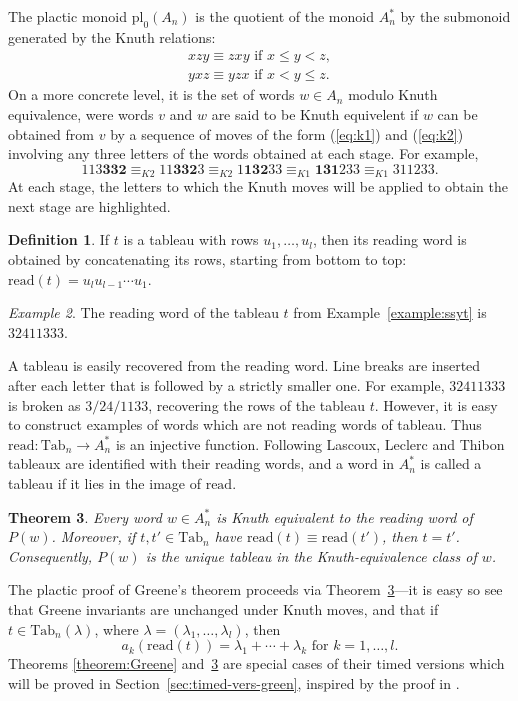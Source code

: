 \documentclass[10pt]{amsproc}
\newtheorem{theorem}{Theorem}[subsection]
\theoremstyle{definition}
\newtheorem{definition}[theorem]{Definition}
\theoremstyle{remark}
\newtheorem{example}[theorem]{Example}
\newcommand{\Tab}{\mathrm{Tab}}
\newcommand{\rc}[1]{\mathbf{#1}}
\newcommand{\rd}{\mathrm{read}}
\newcommand{\pl}{\mathrm{pl}}
\begin{document}
The plactic monoid $\pl_0(A_n)$ is the quotient of the monoid $A_n^*$ by the submonoid generated by the Knuth relations:
\begin{gather}
  \tag{$K1$}\label{eq:k1}
  xzy \equiv zxy \text{ if } x\leq y < z,
  \\
  \tag{$K2$}\label{eq:k2}
  yxz \equiv yzx \text{ if } x < y \leq z.
\end{gather}
On a more concrete level, it is the set of words $w\in A_n$ modulo Knuth equivalence, were words $v$ and $w$ are said to be Knuth equivelent if $w$ can be obtained from $v$ by a sequence of moves of the form (\ref{eq:k1}) and (\ref{eq:k2}) involving any three letters of the words obtained at each stage.
For example,
\begin{displaymath}
  113\rc{332}\equiv_{K2} 11\rc{332}3\equiv_{K2} 1\rc{132}33 \equiv_{K1} \rc{131}233 \equiv_{K1} 311233.
\end{displaymath}
At each stage, the letters to which the Knuth moves will be applied to obtain the next stage are highlighted.
\begin{definition}
  If $t$ is a tableau with rows $u_1,\dotsc,u_l$, then its reading word is obtained by concatenating its rows, starting from bottom to top: $\rd(t) = u_lu_{l-1}\dotsb u_1$.
\end{definition}
\begin{example}
  The reading word of the tableau $t$ from Example~\ref{example:ssyt} is $32411333$.
\end{example}
A tableau is easily recovered from the reading word.
Line breaks are inserted after each letter that is followed by a strictly smaller one.
For example, $32411333$ is broken as $3/24/1133$, recovering the rows of the tableau $t$.
However, it is easy to construct examples of words which are not reading words of tableau.
Thus $\rd:\Tab_n\to A_n^*$ is an injective function.
Following Lascoux, Leclerc and Thibon \cite{Lascoux} tableaux are identified with their reading words, and a word in $A_n^*$ is called a tableau if it lies in the image of $\rd$.
\begin{theorem}
  \label{theorem:unique-tab}
  Every word $w\in A_n^*$ is Knuth equivalent to the reading word of $P(w)$.
  Moreover, if $t,t'\in \Tab_n$ have $\rd(t)\equiv \rd(t')$, then $t=t'$.
  Consequently, $P(w)$ is the unique tableau in the Knuth-equivalence class of $w$.
\end{theorem}
The plactic proof of Greene's theorem proceeds via Theorem~\ref{theorem:unique-tab}---it is easy so see that Greene invariants are unchanged under Knuth moves, and that if $t\in \Tab_n(\lambda)$, where $\lambda=(\lambda_1,\dotsc,\lambda_l)$, then
\begin{displaymath}
  a_k(\rd(t)) = \lambda_1+\dotsb +\lambda_k\text{ for }k=1,\dotsc,l.
\end{displaymath}
Theorems \ref{theorem:Greene} and~\ref{theorem:unique-tab} are special cases of their timed versions which will be proved in Section~\ref{sec:timed-vers-green}, inspired by the proof in \cite{Lascoux}.
\end{document}
